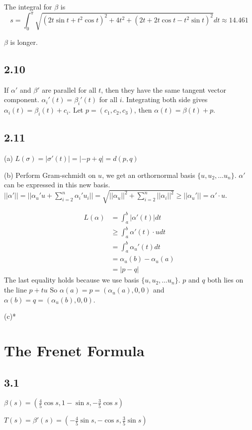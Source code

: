 \documentclass[12pt]{article}
\begin{document}
The integral for $\beta$ is $$s = \int^\pi_0 \sqrt{(2t\sin t + t^2\cos t)^2 + 4t^2 +(2t + 2t\cos t - t^2 \sin t)^2 }dt \approx 14.461$$

$\beta$ is longer.

\subsection*{2.10}
If $\alpha'$ and $\beta'$ are parallel for all $t$, then they have the same tangent vector component. $\alpha_i'(t) = \beta_i'(t)$ for all $i$. Integrating both side gives $\alpha_i(t) = \beta_i(t) + c_i$. Let $p=(c_1, c_2,c_3)$, then $\alpha(t) = \beta(t) + p$.

\subsection*{2.11}
(a) $L(\sigma) = |\sigma'(t)| = |-p + q| = d(p, q)$

(b) Perform Gram-schmidt on $u$, we get an orthornormal basis $\{u, u_2, \ldots u_n\}$. $\alpha'$ can be expressed in this new basis. $||\alpha'|| = ||\alpha_u' u + \sum_{i=2}^n \alpha_i' u_i|| =\sqrt{||\alpha_u||^2 + \sum_{i=2}^n||\alpha_i||^2 }\geq ||\alpha_u'|| = \alpha' \cdot u$.

$$ \begin{aligned}
L(\alpha) &= \int_a^b |\alpha'(t)|dt  \\
	  &\geq \int_a^b \alpha'(t) \cdot u dt \\
	  & = \int_a^b \alpha_u'(t) dt \\
	  & = \alpha_u(b) - \alpha_u(a) \\
	  & = |p - q|
\end{aligned}$$
The last equality holds because we use basis $\{u, u_2, \ldots u_n\}$. $p$ and $q$ both lies on the line $p + tu$ So $\alpha(a) = p = (\alpha_u(a), 0, 0)$ and $\alpha(b) = q = (\alpha_u(b), 0, 0)$.

(c)*

\section{The Frenet Formula}
\subsection*{3.1}
$\beta(s) = (\frac{4}{5}\cos s, 1- \sin s, -\frac{3}{5}\cos s)$

$T(s) = \beta'(s) =(-\frac{4}{5}\sin s, -\cos s, \frac{3}{5}\sin s) $
\end{document}
